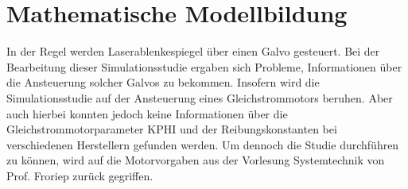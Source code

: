 \newpage




\chapter{Mathematische Modellbildung}
\label{chap:Modellbildung}

In der Regel werden Laserablenkespiegel über einen Galvo gesteuert. Bei der Bearbeitung dieser Simulationsstudie ergaben sich Probleme, Informationen über die Ansteuerung
solcher Galvos zu bekommen. Insofern wird die Simulationsstudie auf der Ansteuerung eines Gleichstrommotors beruhen. Aber auch hierbei konnten jedoch keine Informationen 
über die Gleichstrommotorparameter KPHI und der Reibungskonstanten bei verschiedenen Herstellern gefunden werden. Um dennoch die Studie durchführen zu können, wird auf die
Motorvorgaben aus der Vorlesung Systemtechnik von Prof. Froriep zurück gegriffen.

